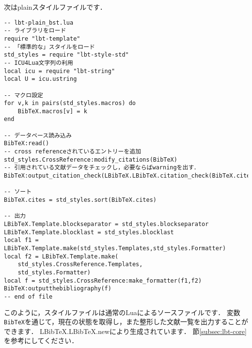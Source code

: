 \documentclass[dvipdfmx,a4paper]{jsarticle}
\begin{document}
次はplainスタイルファイルです．
\begin{lstlisting}
-- lbt-plain_bst.lua
-- ライブラリをロード
require "lbt-template"
-- 「標準的な」スタイルをロード
std_styles = require "lbt-style-std"
-- ICU4Lua文字列の利用
local icu = require "lbt-string"
local U = icu.ustring

-- マクロ設定
for v,k in pairs(std_styles.macros) do
	BibTeX.macros[v] = k
end

-- データベース読み込み
BibTeX:read()
-- cross referenceされているエントリーを追加
std_styles.CrossReference:modify_citations(BibTeX)
-- 引用されている文献データをチェックし，必要ならばwarningを出す．
BibTeX:output_citation_check(LBibTeX.LBibTeX.citation_check(BibTeX.cites))

-- ソート
BibTeX.cites = std_styles.sort(BibTeX.cites)

-- 出力
LBibTeX.Template.blockseparator = std_styles.blockseparator
LBibTeX.Template.blocklast = std_styles.blocklast
local f1 = LBibTeX.Template.make(std_styles.Templates,std_styles.Formatter)
local f2 = LBibTeX.Template.make(
	std_styles.CrossReference.Templates,
	std_styles.Formatter)
local f = std_styles.CrossReference:make_formatter(f1,f2)
BibTeX:outputthebibliography(f)
-- end of file
\end{lstlisting}

このように，スタイルファイルは通常のLuaによるソースファイルです．
変数\verb|BibTeX|を通じて，現在の状態を取得し，また整形した文献一覧を出力することができます．
LBibTeX.LBibTeX.newにより生成されています．
節\ref{subsec:lbt-core}を参考にしてください．
\end{document}
